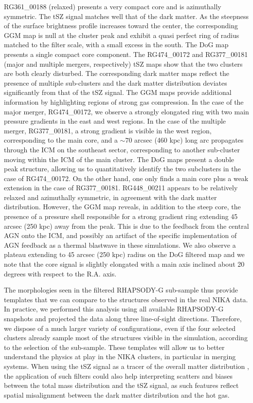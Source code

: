 \documentclass[twocolumn,traditabstract]{aa}
\begin{document}
RG361\_00188 (relaxed) presents a very compact core and is azimuthally symmetric. The tSZ signal matches well that of the dark matter. As the steepness of the surface brightness profile increases toward the center, the corresponding GGM map is null at the cluster peak and exhibit a quasi perfect ring of radius matched to the filter scale, with a small excess in the south. The DoG map presents a single compact core component. The RG474\_00172 and RG377\_00181 (major and multiple mergers, respectively) tSZ maps show that the two clusters are both clearly disturbed. The corresponding dark matter maps reflect the presence of multiple sub-clusters and the dark matter distribution deviates significantly from that of the tSZ signal. The GGM maps provide additional information by highlighting regions of strong gas compression. In the case of the major merger, RG474\_00172, we observe a strongly elongated ring with two main pressure gradients in the east and west regions. In the case of the multiple merger, RG377\_00181, a strong gradient is visible in the west region, corresponding to the main core, and a $\sim 70$ arcsec (460 kpc) long arc propagates through the ICM on the southeast sector, corresponding to another sub-cluster moving within the ICM of the main cluster. The DoG maps present a double peak structure, allowing us to quantitatively identify the two subclusters in the case of RG474\_00172. On the other hand, one only finds a main core plus a weak extension in the case of RG377\_00181. RG448\_00211 appears to be relatively relaxed and azimuthally symmetric, in agreement with the dark matter distribution. However, the GGM map reveals, in addition to the steep core, the presence of a pressure shell responsible for a strong gradient ring extending 45 arcsec (250 kpc) away from the peak. This is due to the feedback from the central AGN onto the ICM, and possibly an artifact of the specific implementation of AGN feedback as a thermal blastwave in these simulations. We also observe a plateau extending to 45 arcsec (250 kpc) radius on the DoG filtered map and we note that the core signal is slightly elongated with a main axis inclined about 20 degrees with respect to the R.A. axis.

The morphologies seen in the filtered RHAPSODY-G sub-sample thus provide templates that we can compare to the structures observed in the real NIKA data. In practice, we performed this analysis using all available RHAPSODY-G snapshots and projected the data along three line-of-sight directions. Therefore, we dispose of a much larger variety of configurations, even if the four selected clusters already sample most of the structures visible in the simulation, according to the selection of the sub-sample. These templates will allow us to better understand the physics at play in the NIKA clusters, in particular in merging systems. When using the tSZ signal as a tracer of the overall matter distribution \citep[e.g.][]{Adam2015,Adam2016a,Ruppin2016}, the application of such filters could also help interpreting scatters and biases between the total mass distribution and the tSZ signal, as such features reflect spatial misalignment between the dark matter distribution and the hot gas.
\end{document}
